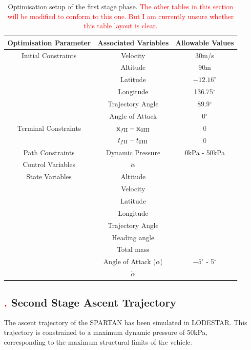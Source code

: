 \begin{table}[ht]
\centering
\begin{tabular}{|c|c|c|}
	\hline Optimisation Parameter  & Associated Variables & Allowable Values\\
	\hline Initial Constraints  & Velocity & 30m/s\\ & Altitude& 90m \\ & Latitude & $-12.16^\circ$ \\& Longitude & 136.75$^\circ$\\ & Trajectory Angle & 89.9$^\circ$\\ & Angle of Attack& 0$^\circ$\\
	\hline Terminal Constraints & $\textbf{x}_{f\textrm{\rom{2}}} - \textbf{x}_{0\textrm{\rom{3}}}$ & 0\\ & $t_{f\textrm{\rom{2}}} - t_{0\textrm{\rom{3}}}$ & 0\\
	\hline Path Constraints & Dynamic Pressure & 0kPa - 50kPa\\ 
		\hline Control Variables & $\ddot{\alpha}$ &\\ 
		\hline State Variables & Altitude & \\ & Velocity& \\  & Latitude& \\  & Longitude& \\  & Trajectory Angle& \\  & Heading angle& \\  & Total mass& \\  & Angle of Attack ($\alpha$)&  $-5^\circ$ - 5$^\circ$\\  & $\dot{\alpha}$& \\ 
	\hline 
\end{tabular} 

\caption{Optimisation setup of the first stage phase. \textcolor{red}{The other tables in this section will be modified to conform to this one. But I am currently unsure whether this table layout is clear.}}

\end{table}



\subsection{\textcolor{red}{.} Second Stage Ascent Trajectory}

The ascent trajectory of the SPARTAN has been simulated in LODESTAR. This trajectory is constrained to a maximum dynamic pressure of 50kPa, corresponding to the maximum structural limits of the vehicle. 

